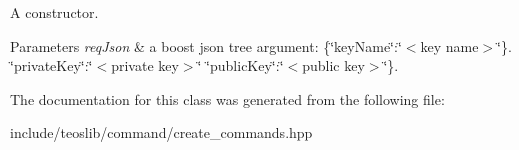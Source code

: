 A constructor. 


\begin{DoxyParams}{Parameters}
{\em req\+Json} & a boost json tree argument\+: \{\char`\"{}key\+Name\char`\"{}\+:\char`\"{}$<$key name$>$\char`\"{}\}. \char`\"{}private\+Key\char`\"{}\+:\char`\"{}$<$private key$>$\char`\"{} \char`\"{}public\+Key\char`\"{}\+:\char`\"{}$<$public key$>$\char`\"{}\}. \\
\hline
\end{DoxyParams}


The documentation for this class was generated from the following file\+:\begin{DoxyCompactItemize}
\item 
include/teoslib/command/create\+\_\+commands.\+hpp\end{DoxyCompactItemize}
